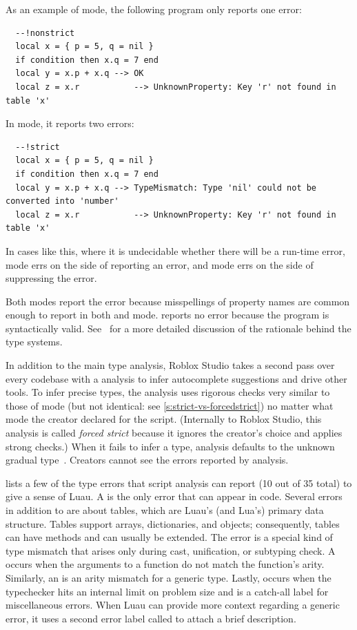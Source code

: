 \documentclass[english,submission,cleveref]{programming}
\begin{document}
 As an example of \mnonstrict{} mode, the following program only reports one error:
\begin{verbatim}
  --!nonstrict
  local x = { p = 5, q = nil }
  if condition then x.q = 7 end
  local y = x.p + x.q --> OK
  local z = x.r           --> UnknownProperty: Key 'r' not found in table 'x'
\end{verbatim}
In \mstrict{} mode, it reports two errors:
\begin{verbatim}
  --!strict
  local x = { p = 5, q = nil }
  if condition then x.q = 7 end
  local y = x.p + x.q --> TypeMismatch: Type 'nil' could not be converted into 'number'
  local z = x.r           --> UnknownProperty: Key 'r' not found in table 'x'
\end{verbatim}
In cases like this, where it is undecidable whether there will be a run-time error,
\mstrict{} mode errs on the side of reporting an error, and \mnonstrict{} mode errs on
the side of suppressing the error.

Both modes report the  error because
misspellings of property names are common enough to report in both
\mstrict{} and \mnonstrict{} mode.
\mnocheck{} reports no error because the program is syntactically valid.
See~\cite{bfj-hatra-2021} for a more detailed discussion of the rationale
behind the type systems.

In addition to the main type analysis, Roblox Studio takes a second pass over
every codebase with a \emph{\FS{}} analysis to infer autocomplete suggestions
and drive other \IDE{} tools.
To infer precise types,
the \FS{} analysis uses rigorous checks very similar to those of
\mstrict{} mode (but not identical: see \cref{s:strict-vs-forcedstrict})
no matter what mode the creator declared for the script.
(Internally to Roblox Studio, this analysis is called \emph{forced strict}
because it ignores the creator's choice and applies strong checks.)
When it fails to infer a type, \FS{} analysis defaults to the unknown gradual
type~\cite{st-sfp-2006}.
Creators cannot see the errors reported by \FS{} analysis.

 lists a few of the type errors that
script analysis can report (10 out of 35 total)
to give a sense of Luau.
A  is the only error that can appear in
\mnocheck{} code.
Several errors in addition to  are about
tables, which are Luau's (and Lua's) primary data structure.
Tables support arrays, dictionaries, and objects; consequently,
tables can have methods and can usually be extended.
The error  is a special kind of type mismatch
that arises only during cast, unification, or subtyping check.
A  occurs when the arguments to a function
do not match the function's arity.
Similarly, an  is an arity mismatch
for a generic type.
Lastly,  occurs when the typechecker hits an
internal limit on problem size and  is a catch-all
label for miscellaneous errors.
When Luau can provide more context regarding a generic error, it uses
a second error label called  to attach
a brief description.
\end{document}
